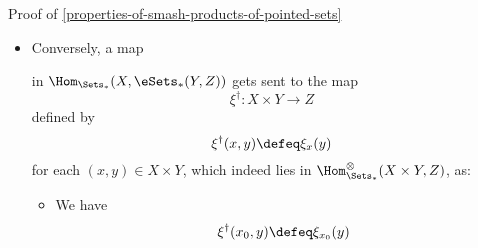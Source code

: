 \begin{Proof}{Proof of \cref{properties-of-smash-products-of-pointed-sets}}
\begin{itemize}
\begin{itemize}
                    \begin{align*}
                        \xi^{\dagger}_{x_{0}}(y) &\defeq \xi(x_{0},y)\\%
                                                 &\defeq z_{0}%
                    \end{align*}
                    for each $y\in Y$. Thus $\xi^{\dagger}_{x_{0}}=\Delta_{z_{0}}$ and $\xi^{\dagger}$ is pointed.
                \item The map $\xi^{\dagger}_{x}$ indeed lies in $\eSets_{*}(Y,Z)$, as we have%
                    \begin{align*}
                        \xi^{\dagger}_{x}(y_{0}) &\defeq \xi(x,y_{0})\\%
                                                 &\defeq z_{0}.%
                    \end{align*}
            \end{itemize}
        \item Conversely, a map
            \begin{webcompile}
                \phantom{\xi\colon}
            \end{webcompile}
            in $\Hom_{\Sets_{*}}(X,\eSets_{*}(Y,Z))$ gets sent to the map
            \[
                \xi^{\dagger}%
                \colon%
                X\times Y%
                \to%
                Z%
            \]%
            defined by
            \[
                \xi^{\dagger}(x,y)%
                \defeq%
                \xi_{x}(y)%
            \]%
            for each $(x,y)\in X\times Y$, which indeed lies in $\Hom^{\otimes}_{\Sets_{*}}(X\times Y,Z)$, as:
            \begin{itemize}
                \item{}We have
                    \begin{align*}
                        \xi^{\dagger}(x_{0},y) &\defeq \xi_{x_{0}}(y)\\%

\end{align*}
\end{itemize}
\end{itemize}
\end{Proof}
